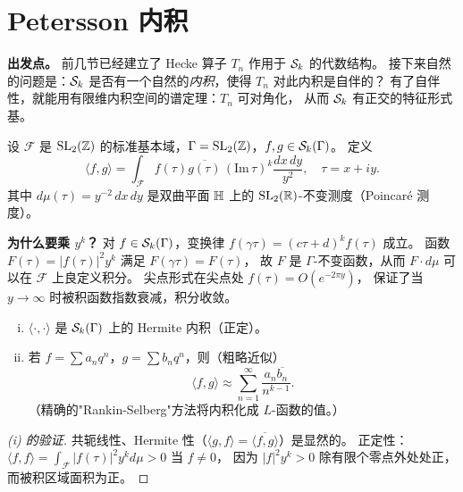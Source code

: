 \section{Petersson 内积}
\label{sec:petersson}

\textbf{出发点。}
前几节已经建立了 Hecke 算子 $T_n$ 作用于 $\mathcal{S}_k$ 的代数结构。
接下来自然的问题是：$\mathcal{S}_k$ 是否有一个自然的\emph{内积}，使得 $T_n$ 对此内积是自伴的？
有了自伴性，就能用有限维内积空间的谱定理：$T_n$ 可对角化，
从而 $\mathcal{S}_k$ 有正交的特征形式基。

\begin{definition}[Petersson 内积]
\label{def:petersson}
设 $\mathcal{F}$ 是 $\mathrm{SL}_2(\mathbb{Z})$ 的标准基本域，$\Gamma = \mathrm{SL}_2(\mathbb{Z})$，$f, g \in \mathcal{S}_k(\Gamma)$。
定义
\[
  \langle f, g \rangle
  = \int_{\mathcal{F}} f(\tau)\overline{g(\tau)}\, (\mathrm{Im}\,\tau)^k
    \frac{dx\,dy}{y^2},
  \quad \tau = x + iy.
\]
其中 $d\mu(\tau) = y^{-2}\,dx\,dy$ 是双曲平面 $\mathbb{H}$ 上的 $\mathrm{SL}_2(\mathbb{R})$-不变测度（Poincaré 测度）。
\end{definition}



\textbf{为什么要乘 $y^k$？}
对 $f \in \mathcal{S}_k(\Gamma)$，变换律 $f(\gamma\tau) = (c\tau+d)^k f(\tau)$ 成立。
函数 $F(\tau) = |f(\tau)|^2 y^k$ 满足 $F(\gamma\tau) = F(\tau)$，
故 $F$ 是 $\Gamma$-不变函数，从而 $F \cdot d\mu$ 可以在 $\mathcal{F}$ 上良定义积分。
尖点形式在尖点处 $f(\tau) = O(e^{-2\pi y})$，
保证了当 $y \to \infty$ 时被积函数指数衰减，积分收敛。

\begin{proposition}[内积的性质]
\label{prop:petersson-properties}
\begin{enumerate}[(i)]
  \item $\langle \cdot, \cdot \rangle$ 是 $\mathcal{S}_k(\Gamma)$ 上的 Hermite 内积（正定）。
  \item 若 $f = \sum a_n q^n$，$g = \sum b_n q^n$，则（粗略近似）
        \[
          \langle f, g \rangle
          \approx \sum_{n=1}^\infty \frac{a_n \overline{b_n}}{n^{k-1}}.
        \]
        （精确的"Rankin-Selberg"方法将内积化成 $L$-函数的值。）
\end{enumerate}
\end{proposition}

\begin{proof}[(i) 的验证]
共轭线性、Hermite 性（$\langle g, f \rangle = \overline{\langle f, g \rangle}$）是显然的。
正定性：$\langle f, f \rangle = \int_\mathcal{F} |f(\tau)|^2 y^k d\mu > 0$ 当 $f \neq 0$，
因为 $|f|^2 y^k > 0$ 除有限个零点外处处正，而被积区域面积为正。
\end{proof}

